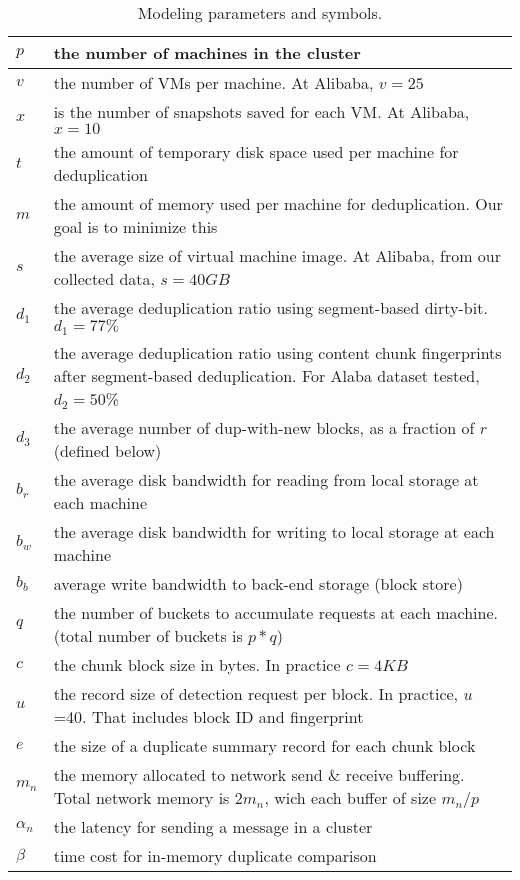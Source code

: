 \begin{table}[ht]
\centering
\begin{tabular}{|p{0.50cm}|p{7cm}|}
\hline
$p$ &  the number of machines in the cluster\\ 
\hline
$v$ & the number of VMs per machine. At Alibaba, $v=25$\\
\hline
$x$ & is the number of snapshots saved for each VM. At Alibaba, $x=10$\\
\hline
$t$ & the amount of temporary disk space used per machine for deduplication\\
\hline
$m$ & the amount of memory used per machine for deduplication. Our goal is to minimize this\\
\hline
$s$ & the average size of virtual machine image. At Alibaba, from our collected data, $s=40GB$\\
\hline
$d_1$ & the average  deduplication ratio using segment-based dirty-bit. $d_1=77\%$\\
\hline
$d_2$ & the average  deduplication ratio using content chunk fingerprints after segment-based deduplication. For Alaba dataset tested,  $d_2=50$\%\\
\hline
$d_3$ & the average number of dup-with-new blocks, as a fraction of $r$ (defined below)\\
\hline
$b_r$ & the average disk bandwidth for reading from local storage at each machine\\
\hline
$b_w$ & the average disk bandwidth for writing to local storage at each machine\\
\hline
$b_b$ & average write bandwidth to back-end storage (block store)\\
\hline
$q$ & the number of buckets to accumulate requests at each machine. (total number of buckets is $p*q$)\\
\hline
$c$ & the chunk block size in bytes.  In practice $c=4KB$\\
\hline
$u$ & the record size of detection request per block.  In practice, $u$=40. That includes block ID and fingerprint\\
\hline
$e$ & the size of a duplicate summary record for each chunk block\\
\hline
$m_n$ & the memory allocated to network send \& receive buffering. Total network memory is $2m_n$, wich each buffer of size $m_n/p$\\
\hline
$\alpha_n$ & the latency for sending a message in a cluster\\
\hline
$\beta$ & time cost for in-memory duplicate comparison\\
\hline
\end{tabular}
\caption{Modeling  parameters and symbols.}
\label{tab:symbol}
\end{table}

